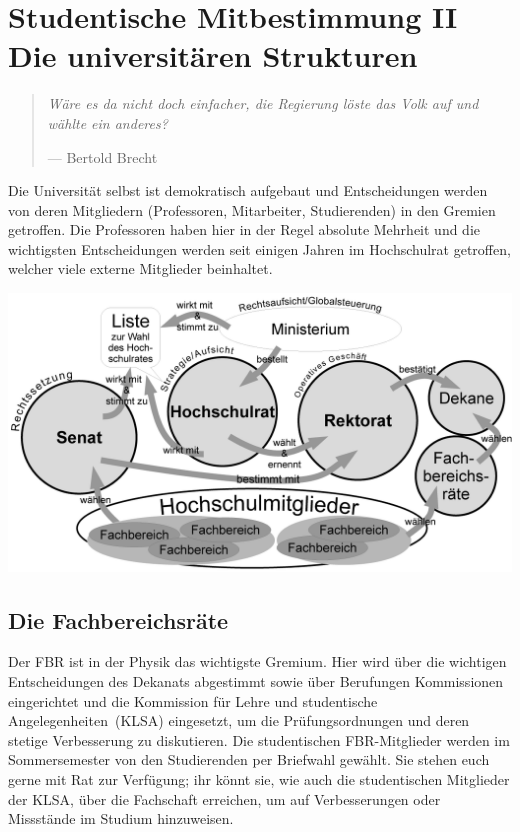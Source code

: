 \section*{Studentische Mitbestimmung II\\Die universitären Strukturen}
\begin{multicols*}{2}
\begin{quote}
\textit{Wäre es da nicht doch einfacher, die Regierung löste das Volk auf und wählte ein anderes?}

\hfill--- Bertold Brecht
\end{quote}
Die Universität selbst ist demokratisch aufgebaut und Entscheidungen werden von deren Mitgliedern (Professoren, Mitarbeiter, Studierenden) in den Gremien getroffen. Die Professoren haben hier in der Regel absolute Mehrheit und die wichtigsten Entscheidungen werden seit einigen Jahren im Hochschulrat getroffen, welcher viele externe Mitglieder beinhaltet.

\medskip
\includegraphics[width=\columnwidth]{res/uni_strukturen.png}

\subsection*{Die Fachbereichsräte}
Der FBR ist in der Physik das wichtigste Gremium. Hier wird über die wichtigen Entscheidungen des Dekanats abgestimmt sowie über Berufungen Kommissionen eingerichtet und die Kommission für Lehre und studentische Angelegenheiten~(KLSA) eingesetzt, um die Prüfungsordnungen und deren stetige Verbesserung zu diskutieren. Die studentischen FBR-Mitglieder werden im Sommersemester von den Studierenden per Briefwahl gewählt. Sie stehen euch gerne mit Rat zur Verfügung; ihr könnt sie, wie auch die studentischen Mitglieder der KLSA, über die Fachschaft erreichen, um auf Verbesserungen oder Missstände im Studium hinzuweisen.


\end{multicols*}

